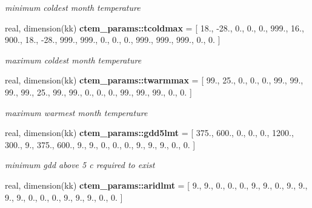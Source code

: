 \begin{DoxyCompactItemize}
\begin{DoxyCompactList}\small\item\em minimum coldest month temperature \end{DoxyCompactList}\item 
\hypertarget{namespacectem__params_a931982e7bbae83e4ebc020aef5e82785}{}real, dimension(kk) {\bfseries ctem\+\_\+params\+::tcoldmax} = \mbox{[} 18., -\/28., 0., 0., 0., 999., 16., 900., 18., -\/28., 999., 999., 0., 0., 0., 999., 999., 999., 0., 0. \mbox{]}\label{namespacectem__params_a931982e7bbae83e4ebc020aef5e82785}

\begin{DoxyCompactList}\small\item\em maximum coldest month temperature \end{DoxyCompactList}\item 
\hypertarget{namespacectem__params_a72a50f8b26e68efe36fe078e192726b7}{}real, dimension(kk) {\bfseries ctem\+\_\+params\+::twarmmax} = \mbox{[} 99., 25., 0., 0., 0., 99., 99., 99., 99., 25., 99., 99., 0., 0., 0., 99., 99., 99., 0., 0. \mbox{]}\label{namespacectem__params_a72a50f8b26e68efe36fe078e192726b7}

\begin{DoxyCompactList}\small\item\em maximum warmest month temperature \end{DoxyCompactList}\item 
\hypertarget{namespacectem__params_a6a7e5c14d01e4234fb7a0ee3fb795c34}{}real, dimension(kk) {\bfseries ctem\+\_\+params\+::gdd5lmt} = \mbox{[} 375., 600., 0., 0., 0., 1200., 300., 9., 375., 600., 9., 9., 0., 0., 0., 9., 9., 9., 0., 0. \mbox{]}\label{namespacectem__params_a6a7e5c14d01e4234fb7a0ee3fb795c34}

\begin{DoxyCompactList}\small\item\em minimum gdd above 5 c required to exist \end{DoxyCompactList}\item 
\hypertarget{namespacectem__params_a5fb0d8e073e3b32005845f96d7ee9eb5}{}real, dimension(kk) {\bfseries ctem\+\_\+params\+::aridlmt} = \mbox{[} 9., 9., 0., 0., 0., 9., 9., 0., 9., 9., 9., 9., 0., 0., 0., 9., 9., 9., 0., 0. \mbox{]}\label{namespacectem__params_a5fb0d8e073e3b32005845f96d7ee9eb5}


\end{DoxyCompactItemize}
